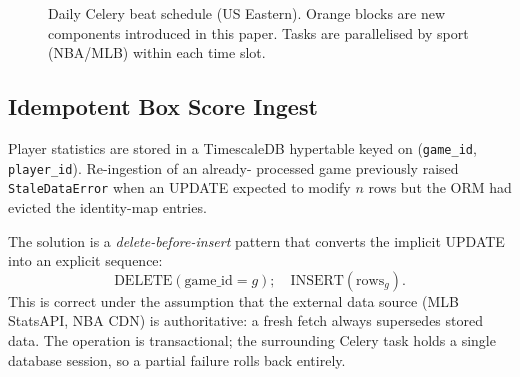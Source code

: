\documentclass[conference]{IEEEtran}
\begin{document}
\begin{figure}[!t]
\centering
{}
\caption{Daily Celery beat schedule (US Eastern).  Orange blocks are
new components introduced in this paper.  Tasks are parallelised by
sport (NBA/MLB) within each time slot.}
\label{fig:pipeline}
\end{figure}

\subsection{Idempotent Box Score Ingest}

Player statistics are stored in a TimescaleDB hypertable keyed on
(\texttt{game\_id}, \texttt{player\_id}).  Re-ingestion of an already-
processed game previously raised \texttt{StaleDataError} when an
UPDATE expected to modify $n$ rows but the ORM had evicted the
identity-map entries.

The solution is a \emph{delete-before-insert} pattern that converts
the implicit UPDATE into an explicit sequence:
\begin{equation}
  \text{DELETE}(\text{game\_id}=g);\quad
  \text{INSERT}(\text{rows}_{g}).
\label{eq:dbi}
\end{equation}
This is correct under the assumption that the external data source
(MLB StatsAPI, NBA CDN) is authoritative: a fresh fetch always
supersedes stored data.  The operation is transactional; the
surrounding Celery task holds a single database session, so a
partial failure rolls back entirely.
\end{document}
